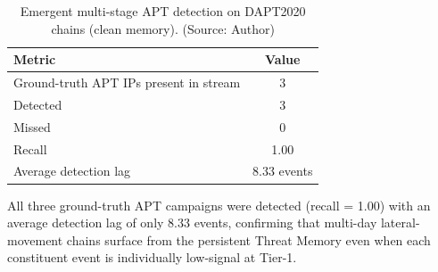 \begin{table}[!htbp]
    \centering
    \caption{Emergent multi-stage APT detection on DAPT2020 chains (clean memory). (Source: Author)}
    \label{tab:apt}
    \begin{tabular}{|l|c|}
        \hline
        \textbf{Metric} & \textbf{Value} \\
        \hline
        Ground-truth APT IPs present in stream & 3 \\
        \hline
        Detected & 3 \\
        \hline
        Missed & 0 \\
        \hline
        Recall & 1.00 \\
        \hline
        Average detection lag & 8.33 events \\
        \hline
    \end{tabular}
\end{table}

All three ground-truth APT campaigns were detected (recall = 1.00) with an average detection lag of only 8.33 events, confirming that multi-day lateral-movement chains surface from the persistent Threat Memory even when each constituent event is individually low-signal at Tier-1.

